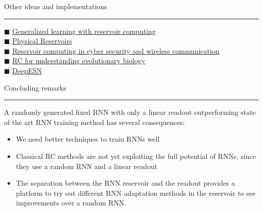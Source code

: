 \documentclass[c,compress]{beamer}
\def\bsq{\color{blue(pigment)} $\blacksquare$ \color{black}}
\begin{document}
\begin{frame}{Other ideas and implementations\\\rule{10.5cm}{0.5pt}} \label{slide8}
\bsq \href{http://prg.cs.umd.edu/research/reservoir_files/reservoir.pdf}{Generalized learning with reservoir computing}\\
\bsq \href{https://iopscience.iop.org/article/10.35848/1347-4065/ab8d4f}{Physical Reservoirs}\\
\bsq \href{https://www.intechopen.com/books/intelligent-system-and-computing/the-novel-applications-of-deep-reservoir-computing-in-cyber-security-and-wireless-communication}{Reservoir computing in cyber security and wireless communication}\\
\bsq \href{https://royalsocietypublishing.org/doi/10.1098/rstb.2018.0377#d3e3070}{RC for understanding evolutionary biology}\\
\bsq \href{https://arxiv.org/pdf/1712.04323.pdf}{DeepESN}
\end{frame}


\begin{frame}{Concluding remarks\\\rule{10.5cm}{0.5pt}} \label{slide9}
A randomly generated fixed RNN with only a linear readout outperforming state of the art RNN training method has several consequences:
\begin{itemize}
    \item We need better techniques to train RNNs well
    
    \item Classical RC methods are not yet exploiting the full potential of RNNs, since they use a random RNN and a linear readout
    
    \item The separation between the RNN reservoir and the readout provides a platform to try out different RNN adaptation methods in the reservoir to see improvements over a random RNN.
    
\end{itemize}

\end{frame}
\end{document}
